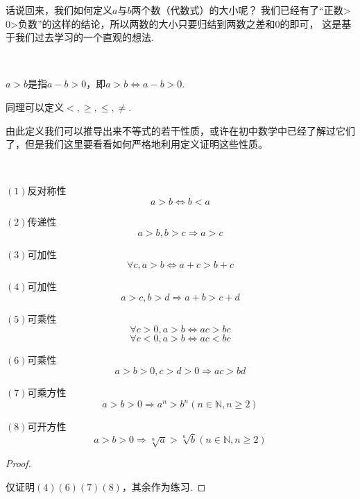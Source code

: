 话说回来，我们如何定义$a$与$b$两个数（代数式）的大小呢？
我们已经有了“正数>$0$>负数”的这样的结论，所以两数的大小只要归结到两数之差和$0$的即可，
这是基于我们过去学习的一个直观的想法.
\begin{definition}
    \ 

    $a>b$是指$a-b>0$，即$a>b\Leftrightarrow a-b>0$.

    同理可以定义$<,\geq,\leq,\neq$.

\end{definition}
由此定义我们可以推导出来不等式的若干性质，或许在初中数学中已经了解过它们了，但是我们这里要看看如何严格地利用定义证明这些性质。
\begin{character}
    \ 

    $(1)$反对称性\[a>b\Leftrightarrow b<a\]

    $(2)$传递性\[a>b,b>c \Rightarrow a>c\]

    $(3)$可加性\uppercase\expandafter{} \[\forall c,a>b\Leftrightarrow a+c>b+c\]

    $(4)$可加性\uppercase\expandafter{}\[a>c,b>d \Rightarrow a+b>c+d \]

    $(5)$可乘性\uppercase\expandafter{}
\[\forall c>0,a>b\Leftrightarrow ac>bc\]
\[\forall c<0,a>b\Leftrightarrow ac<bc\]

    $(6)$可乘性\uppercase\expandafter{}
\[a>b>0,c>d>0 \Rightarrow ac>bd\]

    $(7)$可乘方性
\[a>b>0 \Rightarrow a^n>b^n (n \in \mathbb{N} ,n\geq 2)\]

    $(8)$可开方性
\[a>b>0 \Rightarrow \sqrt[n]{a}>\sqrt[n]{b} (n \in \mathbb{N} ,n\geq 2)\]

\end{character}
\begin{proof}
    \ 

    仅证明$(4)(6)(7)(8)$，其余作为练习.
\end{proof}

